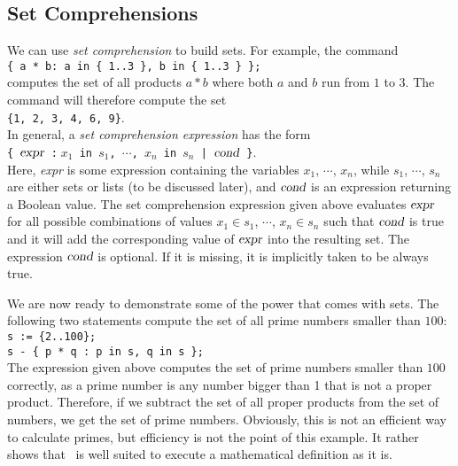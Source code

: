 \subsection{Set Comprehensions}
We can use \emph{set comprehension} to build sets.  For example, the command
\\[0.2cm]
\hspace*{1.3cm}
\texttt{\{ a * b: a in \{ 1..3 \}, b in \{ 1..3 \} \};}
\\[0.2cm]
computes the set of all products $a * b$ where both $a$ and $b$ run from $1$ to $3$.
The command will therefore compute the set
\\[0.2cm]
\hspace*{1.3cm}
\texttt{\{1, 2, 3, 4, 6, 9\}}.
\\[0.2cm]
In general, a \emph{set comprehension expression} has the form
\\[0.2cm]
\hspace*{1.3cm}
\texttt{\{ $\textsl{expr}$ :$\;x_1$ in $s_1$, $\cdots$, $x_n$ in $s_n$ | $\textsl{cond}$ \}}.
\\[0.2cm]
Here, \textsl{expr} is some expression containing the variables $x_1$, $\cdots$, $x_n$, while
$s_1$, $\cdots$, $s_n$ are either sets or lists (to be discussed later), and $\textsl{cond}$ is an
expression returning a Boolean value.  
The  set comprehension expression given above evaluates $\textsl{expr}$ for all possible combinations of 
values $x_1 \in s_1$, $\cdots$, $x_n \in s_n$ such that $\textsl{cond}$ is true and it will add the
corresponding value of $\textsl{expr}$ into the resulting set.
The expression $\textsl{cond}$ is optional.  If it is missing, it is implicitly taken to be
always true.

We are now ready to demonstrate some of the power that comes with sets.  
The following two statements compute the set of all prime numbers smaller than $100$:
\\[0.2cm]
\hspace*{1.3cm}
\texttt{s := \{2..100\};}
\\
\hspace*{1.3cm}
\texttt{s - \{ p * q : p in s, q in s \};}
\\[0.2cm]
The expression given above computes the set of prime numbers smaller
than $100$ correctly, as a prime number
is any number bigger than 1 that is not a proper product.  Therefore, if we subtract the
set of all proper products from the set of numbers, we get the set of prime numbers.
Obviously, this is not an efficient way to calculate primes, but efficiency is not the
point of this example.  It rather shows that \setlx\ is well suited to execute a
mathematical definition as it is.

